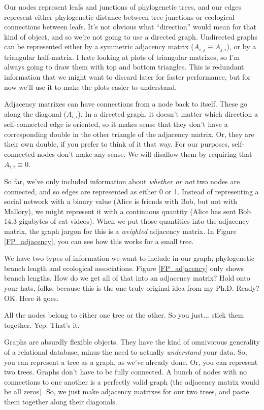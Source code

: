 \documentclass[
10pt, %
a4paper, %
oneside, %
headinclude,footinclude, %
BCOR5mm, %
]{scrartcl}
\begin{document}


Our nodes represent leafs and junctions of phylogenetic trees, and our edges represent either phylogenetic distance between tree junctions or ecological connections between leafs. It's not obvious what ``direction'' would mean for that kind of object, and so we're not going to use a directed graph. Undirected graphs can be represented either by a symmetric adjacency matrix ($A_{i,j} \equiv A_{j,i}$), or by a triangular half-matrix. I hate looking at plots of triangular matrixes, so I'm always going to draw them with top and bottom triangles. This is redundant information that we might want to discard later for faster performance, but for now we'll use it to make the plots easier to understand.

Adjacency matrixes can have connections from a node back to itself. These go along the diagonal ($A_{i,i}$). In a directed graph, it doesn't matter which direction a self-connected edge is oriented, so it makes sense that they don't have a corresponding double in the other triangle of the adjacency matrix. Or, they are their own double, if you prefer to think of it that way. For our purposes, self-connected nodes don't make any sense. We will disallow them by requiring that $A_{i,i} \equiv 0$.

So far, we've only included information about {\em whether or not} two nodes are connected, and so edges are represented as either 0 or 1. Instead of representing a social network with a binary value (Alice is friends with Bob, but not with Mallory), we might represent it with a continuous quantity (Alice has sent Bob 14.3 gigabytes of cat videos). When we put those quantities into the adjacency matrix, the graph jargon for this is a {\em weighted} adjacency matrix. In Figure \ref{FP_adjacency}, you can see how this works for a small tree. 

We have two types of information we want to include in our graph; phylogenetic branch length and ecological associations. Figure \ref{FP_adjacency} only shows branch lengths. How do we get all of that into an adjacency matrix? Hold onto your hats, folks, because this is the one truly original idea from my Ph.D. Ready? OK. Here it goes.

All the nodes belong to either one tree or the other. So you just... stick them together. Yep. That's it.

Graphs are absurdly flexible objects. They have the kind of omnivorous generality of a relational database, minus the need to actually {\em understand} your data. So, you can represent a tree as a graph, as we've already done. Or, you can represent two trees. Graphs don't have to be fully connected. A bunch of nodes with no connections to one another is a perfectly valid graph (the adjacency matrix would be all zeros). So, we just make adjacency matrixes for our two trees, and paste them together along their diagonals.
\end{document}
